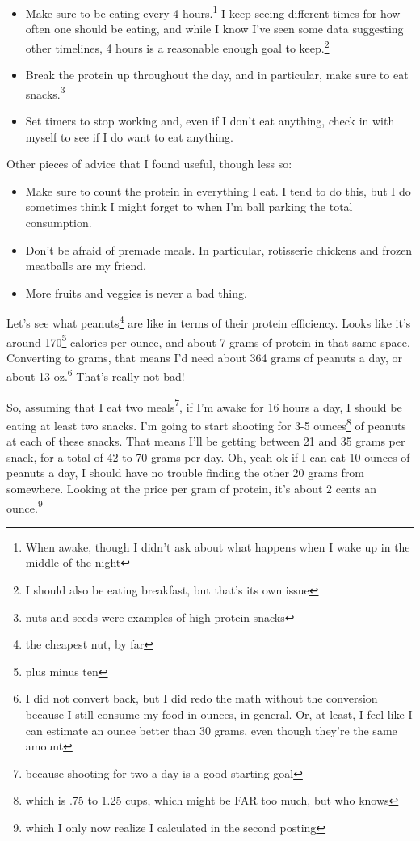 \documentclass[12pt]{article}[titlepage]
\renewcommand{\,}{\textsuperscript{,}}
\begin{document}
\begin{itemize}  
\item Make sure to be eating every 4 hours.\footnote{When awake, though I didn't ask about what happens when I wake up in the middle of the night} I keep seeing different times for how often one should be eating, and while I know I've seen some data suggesting other timelines, 4 hours is a reasonable enough goal to keep.\footnote{I should also be eating breakfast, but that's its own issue}  
\item Break the protein up throughout the day, and in particular, make sure to eat snacks.\footnote{nuts and seeds were examples of high protein snacks}  
\item Set timers to stop working and, even if I don't eat anything, check in with myself to see if I do want to eat anything.  
\end{itemize}

Other pieces of advice that I found useful, though less so:  
\begin{itemize}  
\item Make sure to count the protein in everything I eat. I tend to do this, but I do sometimes think I might forget to when I'm ball parking the total consumption.  
\item Don't be afraid of premade meals. In particular, rotisserie chickens and frozen meatballs are my friend.  
\item More fruits and veggies is never a bad thing.  
\end{itemize}

Let's see what peanuts\footnote{the cheapest nut, by far} are like in terms of their protein efficiency.  
Looks like it's around 170\footnote{plus minus ten} calories per ounce, and about 7 grams of protein in that same space.  
Converting to grams, that means I'd need about 364 grams of peanuts a day, or about 13 oz.\footnote{I did not convert back, but I did redo the math without the conversion because I still consume my food in ounces, in general. Or, at least, I feel like I can estimate an ounce better than 30 grams, even though they're the same amount}  
That's really not bad!

So, assuming that I eat two meals\footnote{because shooting for two a day is a good starting goal}, if I'm awake for 16 hours a day, I should be eating at least two snacks.  
I'm going to start shooting for 3-5 ounces\footnote{which is .75 to 1.25 cups, which might be FAR too much, but who knows} of peanuts at each of these snacks.  
That means I'll be getting between 21 and 35 grams per snack, for a total of 42 to 70 grams per day.  
Oh, yeah ok if I can eat 10 ounces of peanuts a day, I should have no trouble finding the other 20 grams from somewhere.  
Looking at the price per gram of protein, it's about 2 cents an ounce.\footnote{which I only now realize I calculated in the second posting}
\end{document}
